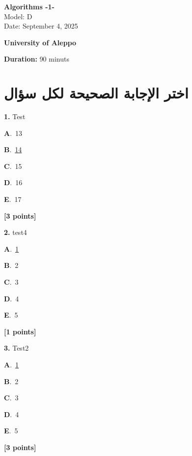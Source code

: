 \documentclass[12pt]{article}
\newcommand{\choice}[3]{%
  \noindent\textbf{#1}.~#2\hfill#3\par\vspace{0.25em}
}
\begin{document}
\begin{flushright}
{\Large \textbf{{\textenglish{Algorithms -1-}}}}\\[0.25em]
{\normalsize \textenglish{Model: }{\textenglish{D}}}\\[0.1em]
{\normalsize \textenglish{Date: }{\textenglish{September 4, 2025}}}
\end{flushright}

\vspace{0.6cm}

\noindent
\begin{minipage}[t]{0.65\textwidth}
  \raggedright
  \textbf{{\textenglish{University of Aleppo}}}\\[0.3em]
\end{minipage}\hfill
\begin{minipage}[t]{0.3\textwidth}
  \raggedleft
  \textenglish{\textbf{Duration: }}{\textenglish{90 minuts}}
\end{minipage}

\vspace{0.9cm}

\section*{اختر الإجابة الصحيحة لكل سؤال}

\noindent \textbf{\textenglish{1.}} {\textenglish{Test}}

\noindent\choice{A}{{\textenglish{13}}}{}
\noindent\choice{B}{\underline{{\textenglish{14}}}}{}
\noindent\choice{C}{{\textenglish{15}}}{}
\noindent\choice{D}{{\textenglish{16}}}{}
\noindent\choice{E}{{\textenglish{17}}}{}
\hfill \textbf{[3 points]}\vspace{0.5em}

\noindent \textbf{\textenglish{2.}} {\textenglish{test4}}

\noindent\choice{A}{\underline{{\textenglish{1}}}}{}
\noindent\choice{B}{{\textenglish{2}}}{}
\noindent\choice{C}{{\textenglish{3}}}{}
\noindent\choice{D}{{\textenglish{4}}}{}
\noindent\choice{E}{{\textenglish{5}}}{}
\hfill \textbf{[1 points]}\vspace{0.5em}

\noindent \textbf{\textenglish{3.}} {\textenglish{Test2}}

\noindent\choice{A}{\underline{{\textenglish{1}}}}{}
\noindent\choice{B}{{\textenglish{2}}}{}
\noindent\choice{C}{{\textenglish{3}}}{}
\noindent\choice{D}{{\textenglish{4}}}{}
\noindent\choice{E}{{\textenglish{5}}}{}
\hfill \textbf{[3 points]}\vspace{0.5em}
\end{document}
